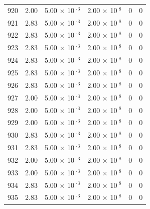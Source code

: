 \documentclass[a4paper,11pt]{article}
\begin{document}
\begin{center}
\begin{longtable}{|R{1.5cm}|R{2.4cm}|R{2.4cm}|R{2.4cm}|R{2.4cm}|R{2.4cm}|}
  920 &   2.00  &         5.00 $\times$ 10$^{\text{          -3}}$  &         2.00 $\times$ 10$^{\text{           8}}$  & 0  & 0 \\
  921 &   2.83  &         5.00 $\times$ 10$^{\text{          -3}}$  &         2.00 $\times$ 10$^{\text{           8}}$  & 0  & 0 \\
  922 &   2.83  &         5.00 $\times$ 10$^{\text{          -3}}$  &         2.00 $\times$ 10$^{\text{           8}}$  & 0  & 0 \\
  923 &   2.83  &         5.00 $\times$ 10$^{\text{          -3}}$  &         2.00 $\times$ 10$^{\text{           8}}$  & 0  & 0 \\
  924 &   2.83  &         5.00 $\times$ 10$^{\text{          -3}}$  &         2.00 $\times$ 10$^{\text{           8}}$  & 0  & 0 \\
  925 &   2.83  &         5.00 $\times$ 10$^{\text{          -3}}$  &         2.00 $\times$ 10$^{\text{           8}}$  & 0  & 0 \\
  926 &   2.83  &         5.00 $\times$ 10$^{\text{          -3}}$  &         2.00 $\times$ 10$^{\text{           8}}$  & 0  & 0 \\
  927 &   2.00  &         5.00 $\times$ 10$^{\text{          -3}}$  &         2.00 $\times$ 10$^{\text{           8}}$  & 0  & 0 \\
  928 &   2.00  &         5.00 $\times$ 10$^{\text{          -3}}$  &         2.00 $\times$ 10$^{\text{           8}}$  & 0  & 0 \\
  929 &   2.00  &         5.00 $\times$ 10$^{\text{          -3}}$  &         2.00 $\times$ 10$^{\text{           8}}$  & 0  & 0 \\
  930 &   2.83  &         5.00 $\times$ 10$^{\text{          -3}}$  &         2.00 $\times$ 10$^{\text{           8}}$  & 0  & 0 \\
  931 &   2.83  &         5.00 $\times$ 10$^{\text{          -3}}$  &         2.00 $\times$ 10$^{\text{           8}}$  & 0  & 0 \\
  932 &   2.00  &         5.00 $\times$ 10$^{\text{          -3}}$  &         2.00 $\times$ 10$^{\text{           8}}$  & 0  & 0 \\
  933 &   2.00  &         5.00 $\times$ 10$^{\text{          -3}}$  &         2.00 $\times$ 10$^{\text{           8}}$  & 0  & 0 \\
  934 &   2.83  &         5.00 $\times$ 10$^{\text{          -3}}$  &         2.00 $\times$ 10$^{\text{           8}}$  & 0  & 0 \\
  935 &   2.83  &         5.00 $\times$ 10$^{\text{          -3}}$  &         2.00 $\times$ 10$^{\text{           8}}$  & 0  & 0 \\

\end{longtable}
\end{center}
\end{document}
